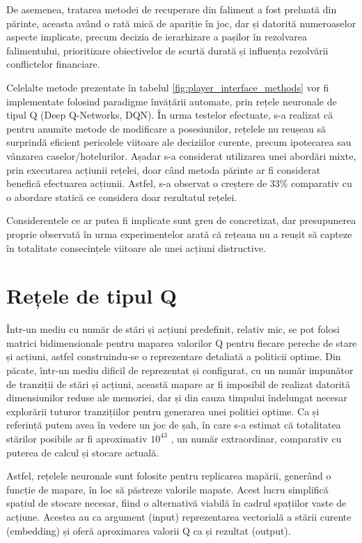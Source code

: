 De asemenea, tratarea metodei de recuperare din faliment a fost preluată din părinte, aceasta având o rată mică de apariție în joc, dar și datorită numeroaselor aspecte implicate, precum decizia de ierarhizare a pașilor în rezolvarea falimentului, prioritizare obiectivelor de scurtă durată și influența rezolvării conflictelor financiare.

Celelalte metode prezentate în tabelul \ref{fig:player_interface_methods} vor fi implementate folosind paradigme învățării automate, prin rețele neuronale de tipul Q (Deep Q-Networks, DQN). În urma testelor efectuate, s-a realizat că pentru anumite metode de modificare a posesiunilor, rețelele nu reușeau să surprindă eficient pericolele viitoare ale deciziilor curente, precum ipotecarea sau vânzarea caselor/hotelurilor. Așadar s-a considerat utilizarea unei abordări mixte, prin executarea acțiunii rețelei, doar când metoda părinte ar fi considerat benefică efectuarea acțiunii. Astfel, s-a observat o creștere de 33\% comparativ cu o abordare statică ce considera doar rezultatul rețelei.

Considerentele ce ar putea fi implicate sunt greu de concretizat, dar presupunerea proprie observată în urma experimentelor arată că rețeaua nu a reușit să capteze în totalitate consecințele viitoare ale unei acțiuni distructive.

\section{Rețele de tipul Q}
Într-un mediu cu număr de stări și acțiuni predefinit, relativ mic, se pot folosi matrici bidimensionale pentru maparea valorilor Q pentru fiecare pereche de stare și acțiuni, astfel construindu-se o reprezentare detaliată a politicii optime. Din păcate, într-un mediu dificil de reprezentat și configurat, cu un număr impunător de tranziții de stări și acțiuni, această mapare ar fi imposibil de realizat datorită dimensiunilor reduse ale memoriei, dar și din cauza timpului îndelungat necesar explorării tuturor tranzițiilor pentru generarea unei politici optime. Ca și referință putem avea în vedere un joc de șah, în care s-a estimat că totalitatea stărilor posibile ar fi aproximativ $10^{43}$ \cite{shannon1950chess}, un număr extraordinar, comparativ cu puterea de calcul și stocare actuală.

Astfel, rețelele neuronale sunt folosite pentru replicarea mapării, generând o funcție de mapare, în loc să păstreze valorile mapate. Acest lucru simplifică spațiul de stocare necesar, fiind o alternativă viabilă în cadrul spațiilor vaste de acțiune. Acestea au ca argument (input) reprezentarea vectorială a stării curente (embedding) și oferă aproximarea valorii Q ca și rezultat (output).


